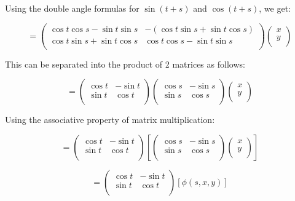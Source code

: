 \documentclass[12pt,letterpaper,reqno]{amsart}
\begin{document}
\begin{enumerate}
\begin{enumerate}
Using the double angle formulas for $\sin{(t+s)}$ and $\cos{(t+s)}$, we get:

$$= \begin{pmatrix}
  \cos{t}\cos{s}-\sin{t}\sin{s} & -(\cos{t}\sin{s}+\sin{t}\cos{s}) \\
  \cos{t}\sin{s}+\sin{t}\cos{s} & \cos{t}\cos{s}-\sin{t}\sin{s} \\
\end{pmatrix}
\begin{pmatrix}
  x \\
  y \\
\end{pmatrix}
$$

This can be separated into the product of 2 matrices as follows:

$$= \begin{pmatrix}
  \cos{t} & -\sin{t} \\
  \sin{t} & \cos{t} \\
\end{pmatrix}
\begin{pmatrix}
  \cos{s} & -\sin{s} \\
  \sin{s} & \cos{s} \\
\end{pmatrix}
\begin{pmatrix}
  x \\
  y \\
\end{pmatrix}$$

Using the associative property of matrix multiplication:

$$= \begin{pmatrix}
  \cos{t} & -\sin{t} \\
  \sin{t} & \cos{t} \\
\end{pmatrix}
\left[
\begin{pmatrix}
  \cos{s} & -\sin{s} \\
  \sin{s} & \cos{s} \\
\end{pmatrix}
\begin{pmatrix}
  x \\
  y \\
\end{pmatrix}
\right]$$

$$= \begin{pmatrix}
  \cos{t} & -\sin{t} \\
  \sin{t} & \cos{t} \\
\end{pmatrix}
[
\phi(s,x,y)
]$$


\end{enumerate}
\end{enumerate}
\end{document}
